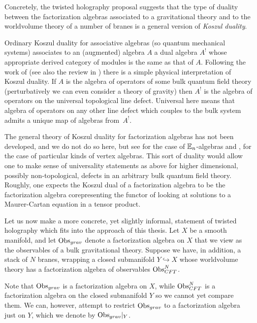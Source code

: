\parsec{}
Concretely, the twisted holography proposal suggests that the type of duality between the factorization algebras associated to a gravitational theory and to the worldvolume theory of a number of branes is a general version of \textit{Koszul duality}.

Ordinary Koszul duality for associative algebras (so quantum mechanical systems) associates to an (augmented) algebra $A$ a dual algebra $A^!$ whose appropriate derived category of modules is the same as that of $A$.
Following the work of \cite{CLsugra, CP1} (see also the review in \cite{PWkoszul}) there is a simple physical interpretation of Koszul duality.
If $A$ is the algebra of operators of some bulk quantum field theory (perturbatively we can even consider a theory of gravity) then $A^!$ is the algebra of operators on the universal topological line defect.
Universal here means that algebra of operators on any other line defect which couples to the bulk system admits a unique map of algebras from~$A^!$.

The general theory of Koszul duality for factorization algebras has not been developed, and we do not do so here, but see \cite{LurieHA} for the case of $\mathbb{E}_n$-algebras and  \cite{gui2022quadratic}, \cite{tamarkin2003deformations} for the case of particular kinds of vertex algebras. This sort of duality would allow one to make sense of universality statements as above for higher dimensional, possibly non-topological, defects in an arbitrary bulk quantum field theory. Roughly, one expects the Koszul dual of a factorization algebra to be the factorization algebra corepresenting the functor of looking at solutions to a Maurer-Cartan equation in a tensor product. 


\parsec{}
Let us now make a more concrete, yet slightly informal, statement of twisted holography which fits into the approach of this thesis. Let $X$ be a smooth manifold, and let $\text{Obs}_{grav}$ denote a factorization algebra on $X$ that we view as the observables of a bulk gravitational theory. Suppose we have, in addition, a stack of $N$ branes, wrapping a closed submanifold $Y\hookrightarrow X$ whose worldvolume theory has a factorization algebra of observables $\text{Obs}_{CFT}^N$. 

Note that $\text{Obs}_{grav}$ is a factorization algebra on $X$, while $\text{Obs}_{CFT}^N$ is a factorization algebra on the closed submanifold $Y$ so we cannot yet compare them.
We can, however, attempt to restrict $\text{Obs}_{grav}$ to a factorization algebra just on $Y$, which we denote by $\text{Obs}_{grav}|_Y$.

